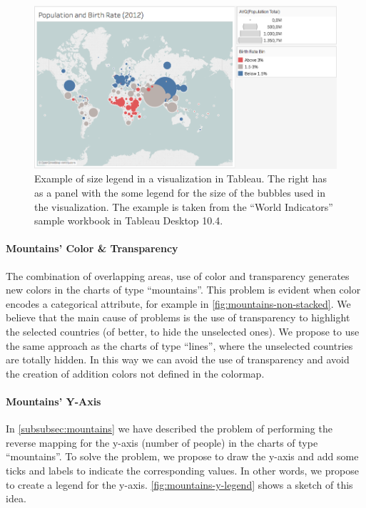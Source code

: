 \begin{figure}[h]
	\centering
	\includegraphics[width=0.95\columnwidth]{figures/size-legend}
	\caption{Example of size legend in a visualization in Tableau. The right has as a panel with the some legend for the size of the bubbles used in the visualization. The example is taken from the ``World Indicators'' sample workbook in Tableau Desktop 10.4.}
	\label{fig:size-legend}
\end{figure}

\paragraph{Mountains' Color \& Transparency}
The combination of overlapping areas, use of color and transparency generates new colors in the charts of type ``mountains''.
This problem is evident when color encodes a categorical attribute, for example in \cref{fig:mountains-non-stacked}.
We believe that the main cause of problems is the use of transparency to highlight the selected countries (of better, to hide the unselected ones).
We propose to use the same approach as the charts of type ``lines'', where the unselected countries are totally hidden.
In this way we can avoid the use of transparency and avoid the creation of addition colors not defined in the colormap.

\paragraph{Mountains' Y-Axis}
In \cref{subsubsec:mountains} we have described the problem of performing the reverse mapping for the y-axis (number of people) in the charts of type ``mountains''.
To solve the problem, we propose to draw the y-axis and add some ticks and labels to indicate the corresponding values.
In other words, we propose to create a legend for the y-axis.
\cref{fig:mountains-y-legend} shows a sketch of this idea.

